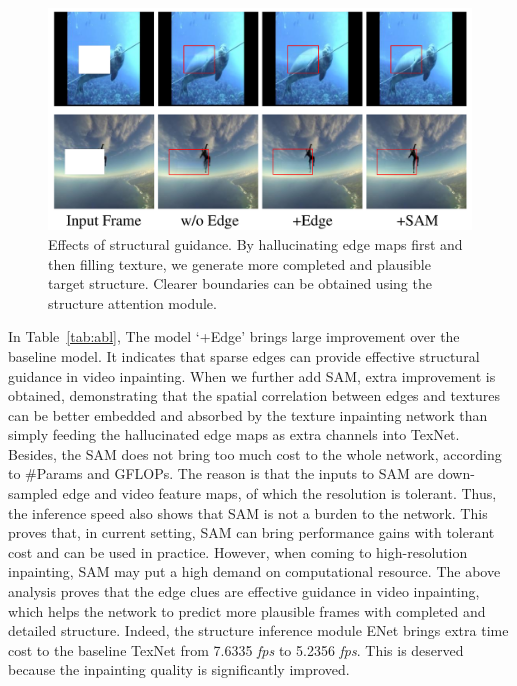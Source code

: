 \begin{figure}[t]
	\centering
	\includegraphics[width=0.97\columnwidth]{edgevis} %
	\caption{Effects of structural guidance. By hallucinating edge maps first and then filling texture, we generate more completed and plausible target structure. Clearer boundaries can be obtained using the structure attention module.}
	\label{edgevis}
\end{figure}



In Table~\ref{tab:abl}, The model `+Edge' brings large improvement over the baseline model.
It indicates that sparse edges can provide effective structural guidance in video inpainting.
When we further add SAM, extra improvement is obtained, demonstrating that the spatial correlation between edges and textures can be better embedded and absorbed by the texture inpainting network than simply feeding the hallucinated edge maps as extra channels into TexNet. {\color{blue}Besides, the SAM does not bring too much cost to the whole network, according to \#Params and GFLOPs. The reason is that the inputs to SAM are down-sampled edge and video feature maps, of which the resolution is tolerant. Thus, the inference speed also shows that SAM is not a burden to the network. This proves that, in current setting, SAM can bring performance gains with tolerant cost and can be used in practice. However, when coming to high-resolution inpainting, SAM may put a high demand on computational resource.}
The above analysis proves that the edge clues are effective guidance in video inpainting, which helps the network to predict more plausible frames with completed and detailed structure.
Indeed, the structure inference module ENet brings extra time cost to the baseline TexNet from 7.6335 \emph{fps} to 5.2356 \emph{fps}.
This is deserved because the inpainting quality is significantly improved.

